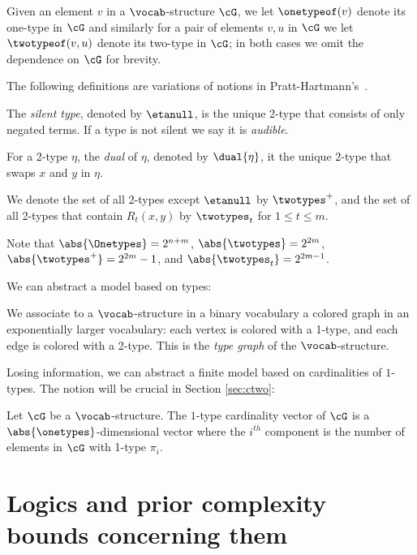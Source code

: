 Given an element $v$ in a $\vocab$-structure $\cG$, we let $\onetypeof(v)$ denote its one-type in $\cG$
and similarly for a pair of elements $v, u$ in $\cG$ we let $\twotypeof(v,u)$ denote its two-type in $\cG$;
in both cases we omit the dependence on $\cG$ for brevity.

The following definitions are variations of notions
in Pratt-Hartmann's~\cite{ctwocomplexity,gctwocomplexity,ianrevisited}.

\begin{definition}
    The \emph{silent type}, denoted by $\etanull$, is the unique 2-type that consists of only negated terms.
    If a type is not silent we say it is \emph{audible}.
\end{definition}

\begin{definition}
    For a 2-type $\eta$, the \emph{dual} of $\eta$, denoted by $\dual{\eta}$,
    it the unique 2-type that swaps $x$ and $y$ in $\eta$.
\end{definition}
We denote
the set of all 2-types except $\etanull$ by $\twotypes^+$, and
the set of all 2-types that contain $R_t(x, y)$ by $\twotypes_t$ for $1 \le t \le m$.

Note that $\abs{\Onetypes} = 2^{n+m}$,
$\abs{\twotypes} = 2^{2m}$, $\abs{\twotypes^+} = 2^{2m}-1$,
and $\abs{\twotypes_t} =2^{2m-1}$.

We can abstract a model based on types:
\begin{definition}
    We associate to a $\vocab$-structure in a binary vocabulary a colored graph in an exponentially larger vocabulary:
    each vertex is colored with a 1-type, and
    each edge is colored with a 2-type. This is the \emph{type graph} of the $\vocab$-structure.
\end{definition}

Losing information, we can abstract a finite model based on cardinalities of $1$-types. The notion will be crucial in Section \ref{sec:ctwo}:
\begin{definition} \label{def:cardboundvector}
    Let $\cG$ be a $\vocab$-structure.
    The $1$-type cardinality vector of $\cG$ is a $\abs{\onetypes}$-dimensional vector 
    where the $i^{th}$ component is the number of elements in $\cG$ with 1-type $\pi_i$.
\end{definition}



\section{Logics and prior complexity bounds concerning them}

